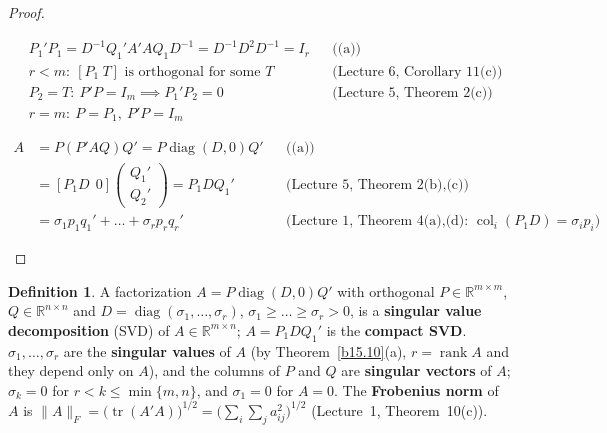 \documentclass[12pt]{article}
\newcommand{\R}{\mathbb R}
\DeclareMathOperator{\tr}{tr}
\DeclareMathOperator{\col}{col}
\DeclareMathOperator{\diag}{diag}
\DeclareMathOperator{\rank}{rank}
\theoremstyle{definition}
\newtheorem{definition}[theorem]{Definition}
\newcommand{\lec}[1]{Lecture~#1}
\newcommand{\boardtop}{\vspace*{-\abovedisplayskip}}
\begin{document}
\begin{proof}
\begin{board}[(b) \(D\) and \(Q\): \(A'A\) is symmetric; \(\lambda_i=\lambda_i(A'A)\):]
\end{board}
\begin{board}[(b) \(P\) is orthogonal:]
\boardtop
\begin{align*}
&P_1'P_1=D^{-1}Q_1'A'AQ_1D^{-1}=D^{-1}D^2D^{-1}=I_r&&\text{((a))}\\
&r<m\colon\ [P_1\ T]\text{ is orthogonal for some }T&&\text{(\lec{6}, Corollary~11(c))}\\
&P_2=T\colon\ P'P=I_m\implies P_1'P_2=0&&\text{(\lec{5}, Theorem~2(c))}\\
&r=m\colon\ P=P_1,\ P'P=I_m
\end{align*}
\end{board}
\begin{board}[(b) The three forms: \(PP'=I_m\), \(QQ'=I_n\) (\lec{6}, Theorem~9):]
\boardtop
\begin{align*}
A&=P(P'AQ)Q'=P\diag(D,0)Q'&&\text{((a))}\\
&=[P_1D\ \ 0]\begin{pmatrix}Q_1'\\Q_2'\end{pmatrix}=P_1DQ_1'&&\text{(\lec{5}, Theorem~2(b),(c))}\\
&=\sigma_1p_1q_1'+\dots+\sigma_rp_rq_r'&&\text{(\lec{1}, Theorem~4(a),(d): \(\col_i(P_1D)=\sigma_ip_i\))}
\end{align*}
\end{board}
\nopagebreak
\end{proof}

\begin{definition}\label{b9.26}
A factorization \(A=P\diag(D,0)Q'\) with orthogonal \(P\in\R^{m\times m}\), \(Q\in\R^{n\times n}\) and
\(D=\diag(\sigma_1,\dots,\sigma_r)\), \(\sigma_1\geqslant\dots\geqslant\sigma_r>0\), is a \textbf{singular value
decomposition} (SVD) of \(A\in\R^{m\times n}\); \(A=P_1DQ_1'\) is the \textbf{compact SVD}. \(\sigma_1,\dots,\sigma_r\)
are the \textbf{singular values} of \(A\) (by Theorem~\ref{b15.10}(a), \(r=\rank A\) and they depend only on \(A\)), and
the columns of \(P\) and \(Q\) are \textbf{singular vectors} of \(A\); \(\sigma_k=0\) for \(r<k\leqslant\min\{m,n\}\),
and \(\sigma_1=0\) for \(A=0\). The \textbf{Frobenius norm} of \(A\) is
\(\lVert A\rVert_F=\bigl(\tr(A'A)\bigr)^{1/2}=\bigl(\sum_i\sum_ja_{ij}^2\bigr)^{1/2}\) (\lec{1}, Theorem~10(c)).
\end{definition}
\end{document}
